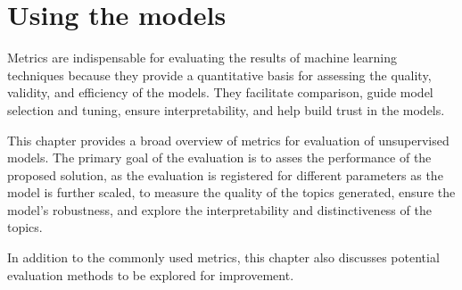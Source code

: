 \section{Using the models}



Metrics are indispensable for evaluating the results of machine learning techniques because they provide a quantitative basis for assessing the quality, validity, and efficiency of the models. They facilitate comparison, guide model selection and tuning, ensure interpretability, and help build trust in the models. 

This chapter provides a broad overview of metrics for evaluation of unsupervised models. The primary goal of the evaluation is to asses the performance of the proposed solution, as the evaluation is registered for different parameters as the model is further scaled, to measure the quality of the topics generated, ensure the model's robustness, and explore the interpretability and distinctiveness of the topics. 


In addition to the commonly used metrics, this chapter also discusses potential evaluation methods to be explored for improvement.



